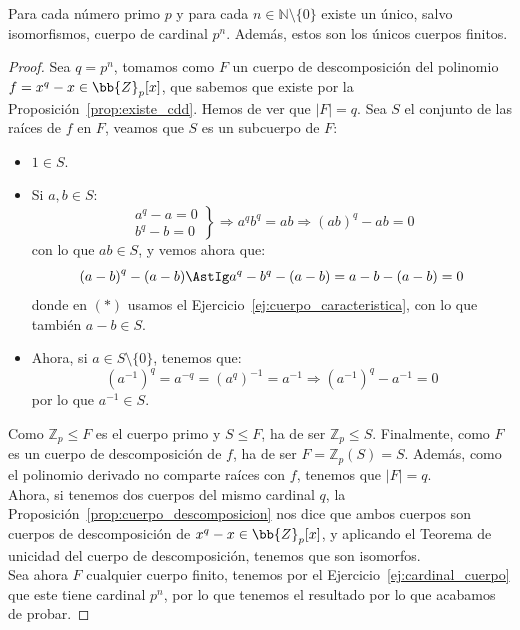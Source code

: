 \begin{teo}\label{teo:clasificacion_cuerpos_finitos}
    Para cada número primo $p$ y para cada $n\in \mathbb{N}\setminus\{0\}$ existe un único, salvo isomorfismos, cuerpo de cardinal $p^n$. Además, estos son los únicos cuerpos finitos.
    \begin{proof}
        Sea $q=p^n$, tomamos como $F$ un cuerpo de descomposición del polinomio $f=x^q-x\in \bb{Z}_p[x]$, que sabemos que existe por la Proposición~\ref{prop:existe_cdd}. Hemos de ver que $|F|=q$. Sea $S$ el conjunto de las raíces de $f$ en $F$, veamos que $S$ es un subcuerpo de $F$:
        \begin{itemize}
            \item $1\in S$.
            \item Si $a,b\in S$:
                \begin{equation*}
                    \left.\begin{array}{l}
                        a^q - a = 0 \\
                        b^q - b = 0 
                    \end{array}\right\} \Longrightarrow a^qb^q = ab \Longrightarrow {(ab)}^{q}-ab = 0
                \end{equation*}
                con lo que $ab\in S$, y vemos ahora que:
                \begin{equation*}
                    {(a-b)}^{q}-(a-b) \AstIg a^q - b^q - (a-b) = a-b-(a-b) = 0
                \end{equation*}
                donde en $(\ast)$ usamos el Ejercicio~\ref{ej:cuerpo_caracteristica}, con lo que también $a-b\in S$.
            \item Ahora, si $a\in S\setminus\{0\}$, tenemos que:
                \begin{equation*}
                    {(a^{-1})}^{q} = a^{-q} = {(a^{q})}^{-1} = a^{-1} \Longrightarrow {(a^{-1})}^{q}-a^{-1} = 0
                \end{equation*}
                por lo que $a^{-1}\in S$.
        \end{itemize}
        Como $\mathbb{Z}_p\leq F$ es el cuerpo primo y $S\leq F$, ha de ser $\mathbb{Z}_p\leq S$. Finalmente, como $F$ es un cuerpo de descomposición de $f$, ha de ser $F=\mathbb{Z}_p(S) =S$. Además, como el polinomio derivado no comparte raíces con $f$, tenemos que $|F| = q$.\\

        \noindent
    Ahora, si tenemos dos cuerpos del mismo cardinal $q$, la Proposición~\ref{prop:cuerpo_descomposicion} nos dice que ambos cuerpos son cuerpos de descomposición de $x^q-x\in \bb{Z}_p[x]$, y aplicando el Teorema de unicidad del cuerpo de descomposición, tenemos que son isomorfos.\\

    \noindent
    Sea ahora $F$ cualquier cuerpo finito, tenemos por el Ejercicio~\ref{ej:cardinal_cuerpo} que este tiene cardinal $p^n$, por lo que tenemos el resultado por lo que acabamos de probar.
    \end{proof}
\end{teo}


